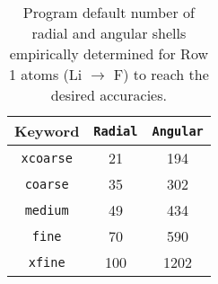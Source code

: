 

\begin{table}[h]
\begin{center}
\caption{Program default number of radial and angular shells empirically determined for Row 1 atoms
  (Li $\rightarrow$ F) to reach the desired accuracies.}

\vspace{.2in}

  \begin{tabular}[right]{|c|c|c|} \hline
Keyword & {\tt Radial} & {\tt Angular}  \\ \hline
{\tt xcoarse} & 21 & 194  \\ \hline
{\tt coarse}  & 35 & 302  \\ \hline
{\tt medium}  & 49 & 434  \\ \hline
{\tt fine}    & 70 & 590  \\ \hline
{\tt xfine}   &100 &1202  \\ \hline
  \end{tabular} \\
\end{center}
\end{table}

